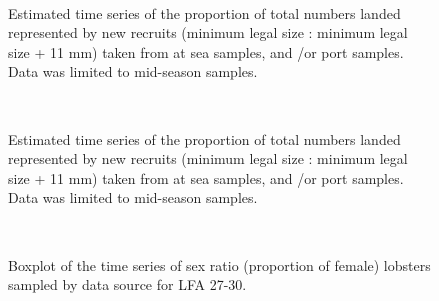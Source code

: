 \documentclass[11pt]{article}
\newcommand{\D}{.}
\newcommand{\e}{/backup/bio_data/bio.lobster/figures/} %
\begin{document}
\begin{landscape}
\begin{figure}
        \centering
         \\
                    
                    \caption{Estimated time series of the proportion of total numbers landed represented by new recruits (minimum legal size : minimum legal size + 11 mm) taken from at sea samples, and /or  port samples. Data was limited to mid-season samples.}
        \end{figure}

\begin{figure}
        \centering
         \\
                    
                    \caption{Estimated time series of the proportion of total numbers landed represented by new recruits (minimum legal size : minimum legal size + 11 mm) taken from at sea samples, and /or  port samples. Data was limited to mid-season samples.}
        \end{figure}

\end{landscape}


\begin{figure}
        \centering
         \\
                     \caption{Boxplot of the time series of sex ratio (proportion of female) lobsters sampled by data source for LFA 27-30.}
        \end{figure}
\end{document}
